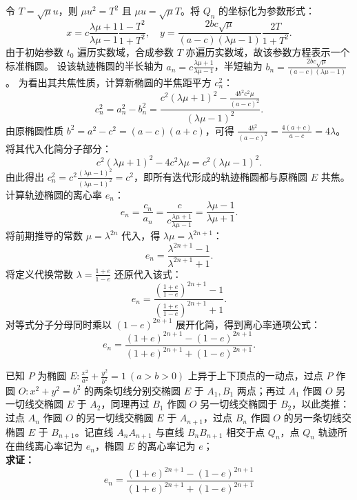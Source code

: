 \begin{solution}
令 $T = \sqrt{\mu} u$，则 $\mu u^2 = T^2$ 且 $\mu u = \sqrt{\mu} T$。将 $Q_n$ 的坐标化为参数形式：
\[ x = c \frac{\lambda \mu + 1}{\lambda \mu - 1} \frac{1 - T^2}{1 + T^2}, \quad y = \frac{2bc\sqrt{\mu}}{(a-c)(\lambda \mu - 1)} \frac{2T}{1 + T^2}. \]
由于初始参数 $t_0$ 遍历实数域，合成参数 $T$ 亦遍历实数域，故该参数方程表示一个标准椭圆。
设该轨迹椭圆的半长轴为 $a_n = c \frac{\lambda \mu + 1}{\lambda \mu - 1}$，半短轴为 $b_n = \frac{2bc\sqrt{\mu}}{(a-c)(\lambda \mu - 1)}$。
为看出其共焦性质，计算新椭圆的半焦距平方 $c_n^2$：
\[ c_n^2 = a_n^2 - b_n^2 = \frac{c^2(\lambda \mu + 1)^2 - \frac{4b^2 c^2 \mu}{(a-c)^2}}{(\lambda \mu - 1)^2}. \]
由原椭圆性质 $b^2 = a^2 - c^2 = (a-c)(a+c)$，可得 $\frac{4b^2}{(a-c)^2} = \frac{4(a+c)}{a-c} = 4\lambda$。
将其代入化简分子部分：
\[ c^2(\lambda \mu + 1)^2 - 4c^2\lambda \mu = c^2(\lambda \mu - 1)^2. \]
由此得出 $c_n^2 = c^2 \frac{(\lambda \mu - 1)^2}{(\lambda \mu - 1)^2} = c^2$，即所有迭代形成的轨迹椭圆都与原椭圆 $E$ 共焦。
计算轨迹椭圆的离心率 $e_n$：
\[ e_n = \frac{c_n}{a_n} = \frac{c}{c \frac{\lambda \mu + 1}{\lambda \mu - 1}} = \frac{\lambda \mu - 1}{\lambda \mu + 1}. \]
将前期推导的常数 $\mu = \lambda^{2n}$ 代入，得 $\lambda \mu = \lambda^{2n+1}$：
\[ e_n = \frac{\lambda^{2n+1} - 1}{\lambda^{2n+1} + 1}. \]
将定义代换常数 $\lambda = \frac{1+e}{1-e}$ 还原代入该式：
\[ e_n = \frac{ \left( \frac{1+e}{1-e} \right)^{2n+1} - 1 }{ \left( \frac{1+e}{1-e} \right)^{2n+1} + 1 }. \]
对等式分子分母同时乘以 $(1-e)^{2n+1}$ 展开化简，得到离心率通项公式：
\[ e_n = \frac{(1+e)^{2n+1} - (1-e)^{2n+1}}{(1+e)^{2n+1} + (1-e)^{2n+1}}. \]

\end{solution}



\begin{exercise}
已知 $P$ 为椭圆 $E: \frac{x^2}{a^2} + \frac{y^2}{b^2} = 1\ (a > b > 0)$ 上异于上下顶点的一动点，过点 $P$ 作圆 $O: x^2 + y^2 = b^2$ 的两条切线分别交椭圆 $E$ 于 $A_1,B_1$ 两点；再过 $A_1$ 作圆 $O$ 另一切线交椭圆 $E$ 于 $A_2$，同理再过 $B_1$ 作圆 $O$ 另一切线交椭圆于 $B_2$，以此类推：过点 $A_n$ 作圆 $O$ 的另一切线交椭圆 $E$ 于 $A_{n+1}$，过点 $B_n$ 作圆 $O$ 的另一条切线交椭圆 $E$ 于 $B_{n+1}$。记直线 $A_nA_{n+1}$ 与直线 $B_nB_{n+1}$ 相交于点 $Q_n$，点 $Q_n$ 轨迹所在曲线离心率记为 $e_n$，椭圆 $E$ 的离心率记为 $e$；\\
\textbf{求证：}
\[
e_n = \frac{(1+e)^{2n+1} - (1-e)^{2n+1}}{(1+e)^{2n+1} + (1-e)^{2n+1}}
\]
\end{exercise}

